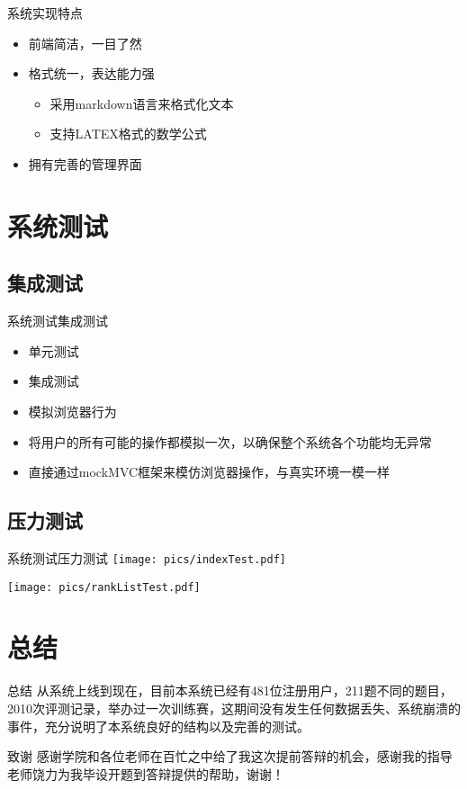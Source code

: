 \documentclass{beamer}
\begin{document}
\begin{frame}{系统实现}{特点}
\begin{itemize}
	\item 前端简洁，一目了然
	\item 格式统一，表达能力强
	\begin{itemize}
		\item 采用markdown语言来格式化文本
		\item 支持LATEX格式的数学公式
	\end{itemize}
	\item 拥有完善的管理界面
\end{itemize}
\end{frame}

\section{系统测试}
\subsection{集成测试}
\begin{frame}{系统测试}{集成测试}
\begin{itemize}
	\item 单元测试
	\item 集成测试
	\item 模拟浏览器行为
	\item 将用户的所有可能的操作都模拟一次，以确保整个系统各个功能均无异常
	\item 直接通过mockMVC框架来模仿浏览器操作，与真实环境一模一样
\end{itemize}
\end{frame}
\subsection{压力测试}
\begin{frame}{系统测试}{压力测试}
\texttt{[image: pics/indexTest.pdf]}

\texttt{[image: pics/rankListTest.pdf]}
\end{frame}

\section{总结}
\begin{frame}{总结}
从系统上线到现在，目前本系统已经有481位注册用户，211题不同的题目，2010次评测记录，举办过一次训练赛，这期间没有发生任何数据丢失、系统崩溃的事件，充分说明了本系统良好的结构以及完善的测试。
\end{frame}
\begin{frame}{致谢}
感谢学院和各位老师在百忙之中给了我这次提前答辩的机会，感谢我的指导老师饶力为我毕设开题到答辩提供的帮助，谢谢！
\end{frame}
\end{document}
